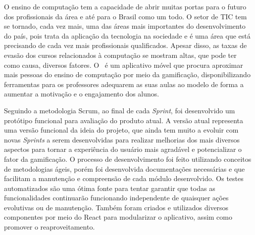 

O ensino de computação tem a capacidade de abrir muitas portas para o futuro dos profissionais da área e até para o Brasil como um todo. O setor de TIC tem se tornado, cada vez mais, uma das áreas mais importantes do desenvolvimento do país, pois trata da aplicação da tecnologia na sociedade e é uma área que está precisando de cada vez mais profissionais qualificados. Apesar disso, as taxas de evasão dos cursos relacionados à computação se mostram altas, que pode ter como causa, diversos fatores. O \appName\ é um aplicativo móvel que procura aproximar mais pessoas do ensino de computação por meio da gamificação, disponibilizando ferramentas para os professores adequarem as suas aulas ao modelo de forma a aumentar a motivação e o engajamento dos alunos.


Seguindo a metodologia Scrum, ao final de cada \textit{Sprint}, foi desenvolvido um protótipo funcional para avaliação do produto atual. A versão atual representa uma versão funcional da ideia do projeto, que ainda tem muito a evoluir com novas \textit{Sprints} a serem desenvolvidas para realizar melhorias dos mais diversos aspectos para tornar a experiência do usuário mais agradável e potencializar o fator da gamificação. O processo de desenvolvimento foi feito utilizando conceitos de metodologias ágeis, porém foi desenvolvida documentações necessárias e que facilitam a manutenção e compreensão de cada módulo desenvolvido. Os testes automatizados \cite{tdd} são uma ótima fonte para tentar garantir que todas as funcionalidades continuarão funcionando independente de quaisquer ações evolutivas ou de manutenção. Também foram criados e utilizados diversos componentes por meio do React para modularizar o aplicativo, assim como promover o reaproveitamento.

